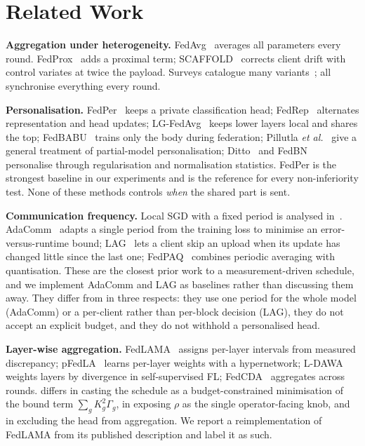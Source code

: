 \section{Related Work}
\label{sec:related}

\textbf{Aggregation under heterogeneity.} FedAvg~\cite{mcmahan2017} averages all parameters every round. FedProx~\cite{li2020fedprox} adds a proximal term; SCAFFOLD~\cite{karimireddy2020} corrects client drift with control variates at twice the payload. Surveys catalogue many variants~\cite{kairouz2021,li2022niid}; all synchronise everything every round.

\textbf{Personalisation.} FedPer~\cite{arivazhagan2019} keeps a private classification head; FedRep~\cite{collins2021} alternates representation and head updates; LG-FedAvg~\cite{liang2020} keeps lower layers local and shares the top; FedBABU~\cite{oh2022} trains only the body during federation; Pillutla \emph{et al.}~\cite{pillutla2022} give a general treatment of partial-model personalisation; Ditto~\cite{li2021ditto} and FedBN~\cite{li2021fedbn} personalise through regularisation and normalisation statistics. FedPer is the strongest baseline in our experiments and is the reference for every non-inferiority test. None of these methods controls \emph{when} the shared part is sent.

\textbf{Communication frequency.} Local SGD with a fixed period is analysed in~\cite{stich2019,wang2021coop}. AdaComm~\cite{wang2019adacomm} adapts a single period from the training loss to minimise an error-versus-runtime bound; LAG~\cite{chen2018lag} lets a client skip an upload when its update has changed little since the last one; FedPAQ~\cite{reisizadeh2020} combines periodic averaging with quantisation. These are the closest prior work to a measurement-driven schedule, and we implement AdaComm and LAG as baselines rather than discussing them away. They differ from \tierfed{} in three respects: they use one period for the whole model (AdaComm) or a per-client rather than per-block decision (LAG), they do not accept an explicit budget, and they do not withhold a personalised head.

\textbf{Layer-wise aggregation.} FedLAMA~\cite{lee2023fedlama} assigns per-layer intervals from measured discrepancy; pFedLA~\cite{ma2022pfedla} learns per-layer weights with a hypernetwork; L-DAWA~\cite{rehman2023} weights layers by divergence in self-supervised FL; FedCDA~\cite{wang2024fedcda} aggregates across rounds. \tierfed{} differs in casting the schedule as a budget-constrained minimisation of the bound term $\sum_g K_g^2\Gamma_g$, in exposing $\rho$ as the single operator-facing knob, and in excluding the head from aggregation. We report a reimplementation of FedLAMA from its published description and label it as such.

